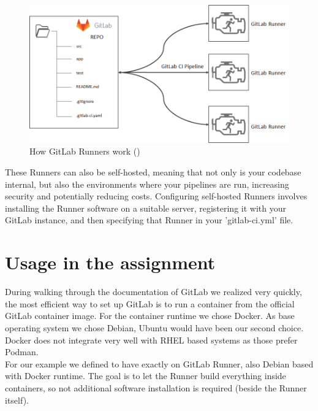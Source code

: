 \begin{figure}[H]
	\centering
	\includegraphics[width=14cm]{images/gitlab_runners.png}
	\caption{How GitLab Runners work (\cite{refGitLabRunners})}
	\label{fig:gitlab_runners}
\end{figure}

These Runners can also be self-hosted, meaning that not only is your codebase internal, but also the environments where your pipelines are run, increasing security and potentially reducing costs.
Configuring self-hosted Runners involves installing the Runner software on a suitable server, registering it with your GitLab instance, and then specifying that Runner in your 'gitlab-ci.yml' file.

\section{Usage in the assignment}

During walking through the documentation of GitLab we realized very quickly, the most efficient way to set up GitLab is to run a container from the official GitLab container image. For the container runtime we chose Docker. As base operating system we chose Debian, Ubuntu would have been our second choice. Docker does not integrate very well with RHEL based systems as those prefer Podman.\\

For our example we defined to have exactly on GitLab Runner, also Debian based with Docker runtime. The goal is to let the Runner build everything inside containers, so not additional software installation is required (beside the Runner itself).
